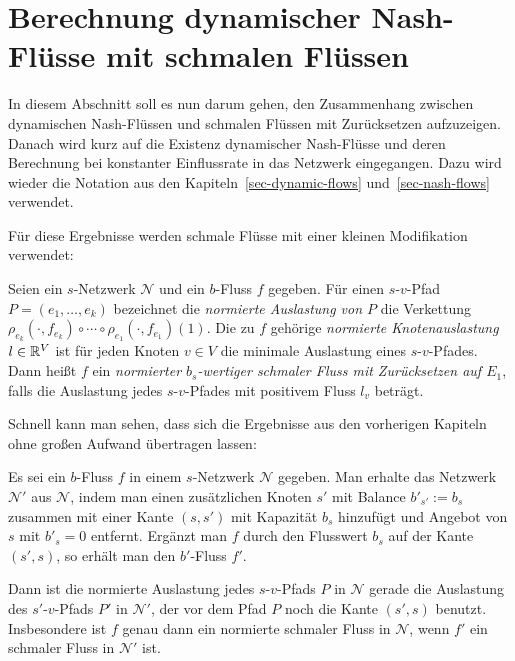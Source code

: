 \section{Berechnung dynamischer Nash-Flüsse mit schmalen Flüssen}\label{sec-nash-flow-extension}
In diesem Abschnitt soll es nun darum gehen, den Zusammenhang zwischen dynamischen Nash-Flüssen und schmalen Flüssen mit Zurücksetzen aufzuzeigen.
Danach wird kurz auf die Existenz dynamischer Nash-Flüsse und deren Berechnung bei konstanter Einflussrate in das Netzwerk eingegangen.
Dazu wird wieder die Notation aus den Kapiteln~\ref{sec-dynamic-flows} und~\ref{sec-nash-flows} verwendet.

Für diese Ergebnisse werden schmale Flüsse mit einer kleinen Modifikation verwendet:

\begin{definition}\label{def-normalized-thin-flow}
	Seien ein $s$-Netzwerk $\mathcal{N}$ und ein $b$-Fluss $f$ gegeben.
	Für einen $s$-$v$-Pfad $P=(e_1, \dots, e_k)$ bezeichnet die \emph{normierte Auslastung von $P$} die Verkettung $\rho_{e_k}(\cdot, f_{e_k}) \circ \cdots \circ \rho_{e_1}(\cdot, f_{e_1})(1)$.
	Die zu $f$ gehörige \emph{normierte Knotenauslastung} $l\in\mathbb{R}^V$ ist für jeden Knoten $v\in V$ die minimale Auslastung eines $s$-$v$-Pfades.
	Dann heißt $f$ ein \emph{normierter $b_s$-wertiger schmaler Fluss mit Zurücksetzen auf $E_1$}, falls die Auslastung jedes $s$-$v$-Pfades mit positivem Fluss $l_v$ beträgt.
\end{definition}

Schnell kann man sehen, dass sich die Ergebnisse aus den vorherigen Kapiteln ohne großen Aufwand übertragen lassen:

\begin{proposition}
	Es sei ein $b$-Fluss $f$ in einem $s$-Netzwerk $\mathcal{N}$ gegeben.
	Man erhalte das Netzwerk $\mathcal{N}'$ aus $\mathcal{N}$, indem man einen zusätzlichen Knoten $s'$ mit Balance $b'_{s'} := b_s$ zusammen mit einer Kante $(s, s')$ mit Kapazität $b_s$ hinzufügt und Angebot von $s$ mit $b'_s = 0$ entfernt.
	Ergänzt man $f$ durch den Flusswert $b_s$ auf der Kante $(s', s)$, so erhält man den $b'$-Fluss $f'$.
	
	Dann ist die normierte Auslastung jedes $s$-$v$-Pfads $P$ in $\mathcal{N}$ gerade die Auslastung des $s'$-$v$-Pfads $P'$ in $\mathcal{N}'$, der vor dem Pfad $P$ noch die Kante $(s', s)$ benutzt.
	Insbesondere ist $f$ genau dann ein normierte schmaler Fluss in $\mathcal{N}$, wenn $f'$ ein schmaler Fluss in $\mathcal{N'}$ ist.
\end{proposition}

